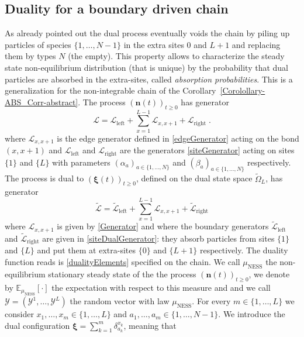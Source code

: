 \documentclass[10pt]{article}
\numberwithin{equation}{section}
\numberwithin{equation}{subsection}
\newcommand{\dt}{\;.}
\begin{document}
\subsection{Duality for a boundary driven chain}\label{Subsection-ss-nonI}
 As already pointed out the dual process eventually voids the chain by piling up particles of species $\{1,\ldots,N-1\}$ in the extra sites $0$ and $L+1$ and replacing them by types $N$ (the empty). This property allows to characterize the steady state non-equilibrium distribution (that is unique) by the probability that dual particles are absorbed in the extra-sites, called \textit{absorption probabilities}. This is a generalization for the non-integrable chain of the Corollary~\ref{Corolollary-ABS_Corr-abstract}. The process $\left(\bm{n}(t)\right)_{t\geq0}$ has generator
\begin{equation}
	\mathcal{L}=\mathcal{L}_{\text{left}}+\sum_{x=1}^{L-1}\mathcal{L}_{x,x+1}+\mathcal{L}_{\text{right}}\dt
\end{equation} 
where $\mathcal{L}_{x,x+1}$ is the edge generator defined in \eqref{edgeGenerator} acting on the bond $(x,x+1)$ and $\mathcal{L}_{\text{left}}$ and $\mathcal{L}_{\text{right}}$ are the generators \eqref{siteGenerator} acting on sites $\{1\}$ and $\{L\}$ with parameters $(\alpha_{a})_{a\in \{1,\ldots,N\}}$ and $(\beta_{a})_{a\in \{1,\ldots,N\}}$ respectively. 
The process is dual to $(\bm{\xi}(t))_{t\geq0}$, defined on the dual state space $\widetilde{\Omega}_{L}$, has generator
\begin{equation}
	\widetilde{\mathcal{L}}=\widetilde{\mathcal{L}}_{\text{left}}+\sum_{x=1}^{L-1}\mathcal{L}_{x,x+1}+\widetilde{\mathcal{L}}_{\text{right}}
\end{equation} 
where $\mathcal{L}_{x,x+1}$ is given by \eqref{Generator} and where the boundary generators $\widetilde{\mathcal{L}}_{\text{left}}$ and $\widetilde{\mathcal{L}}_{\text{right}}$ are given in \eqref{siteDualGenerator}: they absorb particles from sites $\{1\}$ and $\{L\}$ and put them at extra-sites $\{0\}$ and $\{L+1\}$ respectively. The duality function reads is \eqref{dualityElements} specified on the chain. 
We call $\mu_{\text{NESS}}$ the non-equilibrium stationary steady state of the the process $(\bm{n}(t))_{t\geq 0}$, we denote by $\mathbb{E}_{\mu_{\text{NESS}}}[\cdot]$ the expectation with respect to this measure and and we call $\bm{\mathcal{Y}} = (\mathcal{Y}^{1},\ldots,\mathcal{Y}^{L})$ the random vector with law $\mu_{\text{NESS}}$. For every $m\in\{1,\ldots,L\}$ we consider  $x_{1},\ldots,x_{m}\in\{1,\ldots,L\}$ and $a_{1},\ldots,a_{m}\in \{1,\ldots,N-1\}$. We introduce the dual configuration  $\bm{\xi}=\sum_{k=1}^{m}\delta_{a_{k}}^{x_{k}}$, meaning that 
\end{document}
